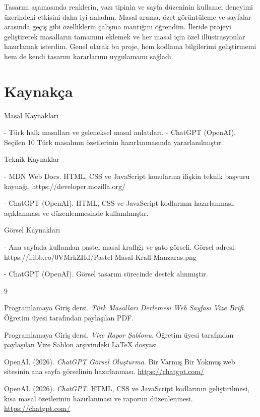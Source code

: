 \documentclass[12pt,a4paper]{article}
\begin{document}
Tasarım aşamasında renklerin, yazı tipinin ve sayfa düzeninin kullanıcı deneyimi üzerindeki etkisini daha iyi anladım. Masal arama, özet görüntüleme ve sayfalar arasında geçiş gibi özelliklerin çalışma mantığını öğrendim. İleride projeyi geliştirerek masalların tamamını eklemek ve her masal için özel illüstrasyonlar hazırlamak isterdim. Genel olarak bu proje, hem kodlama bilgilerimi geliştirmemi hem de kendi tasarım kararlarımı uygulamamı sağladı.

\section{Kaynakça}
 Masal Kaynakları

- Türk halk masalları ve geleneksel masal anlatıları.
- ChatGPT (OpenAI). Seçilen 10 Türk masalının özetlerinin hazırlanmasında yararlanılmıştır.

Teknik Kaynaklar

- MDN Web Docs. HTML, CSS ve JavaScript konularına ilişkin teknik başvuru kaynağı. https://developer.mozilla.org/

- ChatGPT (OpenAI). HTML, CSS ve JavaScript kodlarının hazırlanması, açıklanması ve düzenlenmesinde kullanılmıştır.

Görsel Kaynakları

- Ana sayfada kullanılan pastel masal krallığı ve şato görseli. Görsel adresi: https://i.ibb.co/0VMrkZHd/Pastel-Masal-Krall-Manzaras.png

- ChatGPT (OpenAI). Görsel tasarım sürecinde destek alınmıştır.

\begin{thebibliography}{9}

Programlamaya Giriş dersi.
\emph{Türk Masalları Derlemesi Web Sayfası Vize Brifi}.
Öğretim üyesi tarafından paylaşılan PDF.

Programlamaya Giriş dersi.
\emph{Vize Rapor Şablonu}.
Öğretim üyesi tarafından paylaşılan Vize Sablon arşivindeki LaTeX dosyası.

OpenAI. (2026).
\emph{ChatGPT Görsel Oluşturma}.
Bir Varmış Bir Yokmuş web sitesinin ana sayfa görselinin hazırlanması.
\url{https://chatgpt.com/}

OpenAI. (2026).
\emph{ChatGPT}.
HTML, CSS ve JavaScript kodlarının geliştirilmesi,
kısa masal özetlerinin hazırlanması ve raporun düzenlenmesi.
\url{https://chatgpt.com/}

\end{thebibliography}
\end{document}
